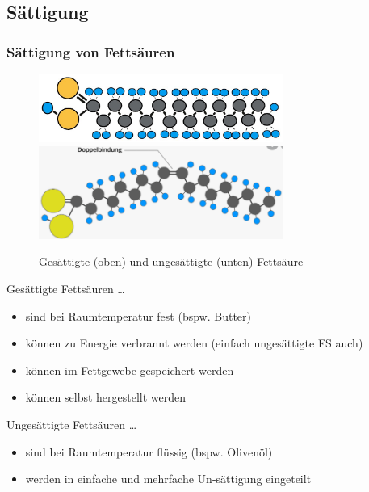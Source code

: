 \documentclass[xcolor=dvipsnames]{beamer}
\begin{document}
    \subsection{Sättigung}
    \begin{frame}[allowframebreaks]
        \frametitle{Sättigung von Fettsäuren}

        \begin{figure}
            \centering
            \includegraphics[width=8cm]{../images/fs_3.jpeg}
            \includegraphics[width=8cm]{../images/fs_4.png}
            \caption{Gesättigte (oben) und ungesättigte (unten) Fettsäure}
        \end{figure}

        \framebreak

        \begin{block}{Gesättigte Fettsäuren \ldots}
            \begin{itemize}
                \setlength\itemsep{1em}
                \item sind bei Raumtemperatur fest (bspw. Butter)
                \item können zu Energie verbrannt werden (einfach ungesättigte FS auch)
                \item können im Fettgewebe gespeichert werden
                \item können selbst hergestellt werden
            \end{itemize}
        \end{block}

        \framebreak

        \begin{block}{Ungesättigte Fettsäuren \ldots}
            \begin{itemize}
                \setlength\itemsep{1em}
                \item sind bei Raumtemperatur flüssig (bspw. Olivenöl)
                \item werden in einfache und mehrfache Un-sättigung eingeteilt
            \end{itemize}
        \end{block}


\end{frame}
\end{document}
